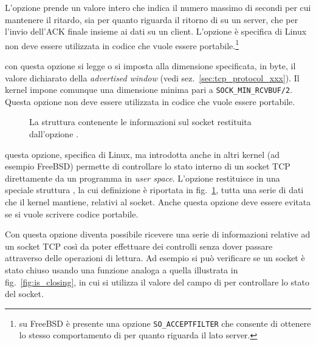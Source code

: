 \begin{basedescript}{\desclabelwidth{1.5cm}\desclabelstyle{\nextlinelabel}}
  L'opzione prende un valore intero che indica il numero massimo di secondi
  per cui mantenere il ritardo, sia per quanto riguarda il ritorno di
   su un server, che per l'invio dell'ACK finale insieme ai dati
  su un client. L'opzione è specifica di Linux non deve essere utilizzata in
  codice che vuole essere portabile.\footnote{su FreeBSD è presente una
    opzione \texttt{SO\_ACCEPTFILTER} che consente di ottenere lo stesso
    comportamento di  per quanto riguarda il lato
    server.}

\item[\constd{TCP\_WINDOW\_CLAMP}] con questa opzione si legge o si imposta
  alla dimensione specificata, in byte, il valore dichiarato della
  \textit{advertised window} (vedi sez.~\ref{sec:tcp_protocol_xxx}). Il kernel
  impone comunque una dimensione minima pari a \texttt{SOCK\_MIN\_RCVBUF/2}.
  Questa opzione non deve essere utilizzata in codice che vuole essere
  portabile.

\begin{figure}[!htb]
  \footnotesize \centering
  \begin{minipage}[c]{0.80\textwidth}
  \end{minipage}
  \caption{La struttura  contenente le informazioni sul
    socket restituita dall'opzione .}
  \label{fig:tcp_info_struct}
\end{figure}

\item[\constd{TCP\_INFO}] questa opzione, specifica di Linux, ma introdotta
  anche in altri kernel (ad esempio FreeBSD) permette di controllare lo stato
  interno di un socket TCP direttamente da un programma in \textit{user space}.
  L'opzione restituisce in una speciale struttura , la cui
  definizione è riportata in fig.~\ref{fig:tcp_info_struct}, tutta una serie
  di dati che il kernel mantiene, relativi al socket.  Anche questa opzione
  deve essere evitata se si vuole scrivere codice portabile.

  Con questa opzione diventa possibile ricevere una serie di informazioni
  relative ad un socket TCP così da poter effettuare dei controlli senza dover
  passare attraverso delle operazioni di lettura. Ad esempio si può verificare
  se un socket è stato chiuso usando una funzione analoga a quella illustrata
  in fig.~\ref{fig:is_closing}, in cui si utilizza il valore del campo
   di  per controllare lo stato del socket.


\end{basedescript}
